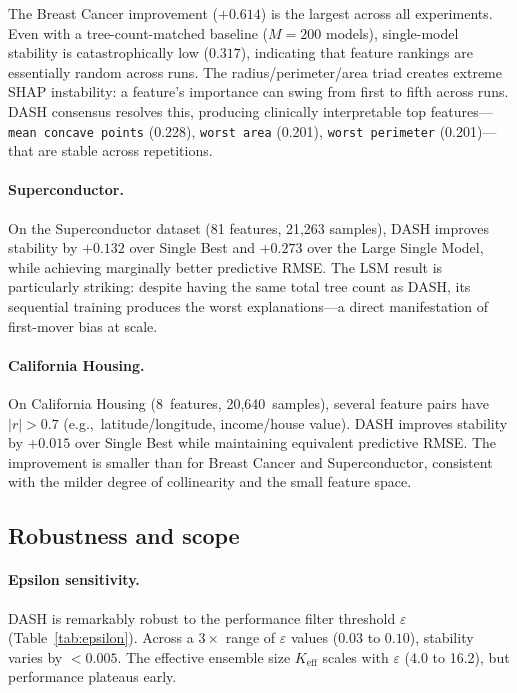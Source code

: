 \documentclass[11pt]{article}
\newcommand{\dash}{\textsc{DASH}}
\newcommand{\eg}{e.g.,\ }
\begin{document}
The Breast Cancer improvement ($+0.614$) is the largest across all
experiments. Even with a tree-count-matched baseline ($M{=}200$ models),
single-model stability is catastrophically low ($0.317$), indicating
that feature rankings are essentially random across runs. The
radius/perimeter/area triad creates extreme SHAP instability: a
feature's importance can swing from first to fifth across runs. \dash{}
consensus resolves this, producing clinically interpretable top
features---\texttt{mean concave points}
(0.228), \texttt{worst area} (0.201), \texttt{worst perimeter}
(0.201)---that are stable across repetitions.

\paragraph{Superconductor.}
On the Superconductor dataset (81 features, 21,263 samples), \dash{}
improves stability by $+0.132$ over Single Best and $+0.273$ over the
Large Single Model, while achieving marginally better predictive RMSE.
The LSM result is particularly striking: despite having the same total tree count
as \dash{}, its sequential training produces the
worst explanations---a direct manifestation of first-mover bias at scale.

\paragraph{California Housing.}
On California Housing (8~features, 20,640~samples), several feature
pairs have $|r| > 0.7$ (\eg latitude/longitude, income/house value).
\dash{} improves stability by $+0.015$ over Single Best while
maintaining equivalent predictive RMSE. The improvement is smaller than
for Breast Cancer and Superconductor, consistent with the milder degree
of collinearity and the small feature space.

\subsection{Robustness and scope}
\label{sec:robustness}

\paragraph{Epsilon sensitivity.}
\dash{} is remarkably robust to the performance filter threshold
$\varepsilon$ (Table~\ref{tab:epsilon}). Across a $3\times$ range of
$\varepsilon$ values ($0.03$ to $0.10$), stability varies by $< 0.005$.
The effective ensemble size $K_{\text{eff}}$ scales with $\varepsilon$
(4.0 to 16.2), but performance plateaus early.
\end{document}
